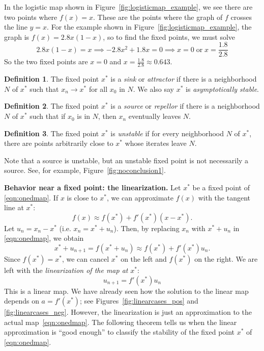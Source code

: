 \documentclass[reqno]{immbook}
\numberwithin{equation}{chapter}
\numberwithin{question}{section}
\numberwithin{theorem}{chapter}
\numberwithin{figure}{chapter}
\theoremstyle{definition}
\newtheorem{definition}{Definition}[section]
\begin{document}
In the logistic map shown in Figure~\ref{fig:logisticmap_example},
we see there are two
points where $f(x)=x$.  These are the points
where the graph of $f$ crosses the line $y=x$.
For the example shown in Figure~\ref{fig:logisticmap_example},
the graph is $f(x) = 2.8x(1-x)$, so to find the fixed points,
we must solve
\begin{equation}
  2.8x(1-x) = x \implies -2.8x^2 + 1.8x = 0
  \implies x = 0 \;\textrm{or}\; x = \frac{1.8}{2.8}
\end{equation}
So the two fixed points are $x=0$ and $x=\frac{1.8}{2.8}\approx 0.643$.

\begin{definition}
The fixed point $x^*$ is a \emph{sink} or \emph{attractor}
if there is a neighborhood $N$ of $x^*$ such that
$x_n\rightarrow x^*$ for all $x_0$ in $N$.
We also say $x^*$ is \emph{asymptotically stable}.
\end{definition}
\begin{definition}
The fixed point $x^*$ is a \emph{source} or \emph{repellor}
if there is a neighborhood $N$ of $x^*$ such that if $x_0$
is in $N$, then $x_n$ eventually leaves $N$.
\end{definition}
\begin{definition}
The fixed point $x^*$ is \emph{unstable} if for every
neighborhood $N$ of $x^*$, there are points arbitrarily close
to $x^*$ whose iterates leave $N$.
\end{definition}

\vspace{0.2cm}
Note that a source is unstable, but an unstable fixed point
is not necessarily a source.  See, for example,
Figure~\ref{fig:noconclusion1}.





\noindent
\textbf{Behavior near a fixed point: the linearization.}
Let $x^*$ be a fixed point of \eqref{eqn:onedmap}.
If $x$ is close to $x^*$,
we can approximate $f(x)$ with the tangent line at $x^*$:
\begin{equation}
   f(x) \approx f(x^*) + f'(x^*)(x-x^*).
\end{equation}
Let $u_n = x_n-x^*$ (i.e. $x_n = x^* + u_n$).
Then, by replacing $x_n$ with $x^*+u_n$
in \eqref{eqn:onedmap}, we obtain
\begin{equation}
  x^* + u_{n+1} = f(x^*+u_n) \approx f(x^*)+f'(x^*)u_n.
\end{equation}
Since $f(x^*)=x^*$, we can cancel $x^*$ on the left
and $f(x^*)$ on the right.
We are left with the
\emph{linearization of the map at } $x^*$:
\begin{equation}
  u_{n+1} = f'(x^*)u_n
\end{equation}
This is a linear map.
We have already seen how the solution to the linear
map depends on $a=f'(x^*)$; see Figures~\ref{fig:linearcases_pos}
and \ref{fig:linearcases_neg}.
However, the linearization is just an approximation
to the actual map~\eqref{eqn:onedmap}.
The following theorem tells us when the linear approximation
is ``good enough'' to classify the stability of the
fixed point $x^*$ of \eqref{eqn:onedmap}.
\end{document}
